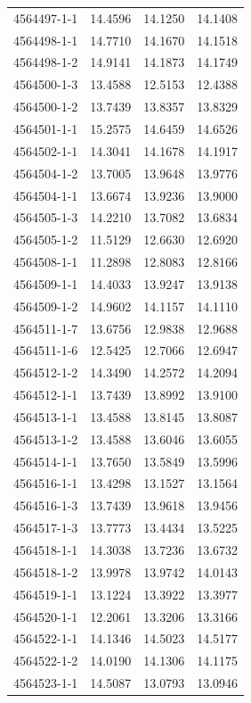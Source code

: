 \begin{longtable}{lrrr}
4564497-1-1 & 14.4596 & 14.1250 & 14.1408 \\
4564498-1-1 & 14.7710 & 14.1670 & 14.1518 \\
4564498-1-2 & 14.9141 & 14.1873 & 14.1749 \\
4564500-1-3 & 13.4588 & 12.5153 & 12.4388 \\
4564500-1-2 & 13.7439 & 13.8357 & 13.8329 \\
4564501-1-1 & 15.2575 & 14.6459 & 14.6526 \\
4564502-1-1 & 14.3041 & 14.1678 & 14.1917 \\
4564504-1-2 & 13.7005 & 13.9648 & 13.9776 \\
4564504-1-1 & 13.6674 & 13.9236 & 13.9000 \\
4564505-1-3 & 14.2210 & 13.7082 & 13.6834 \\
4564505-1-2 & 11.5129 & 12.6630 & 12.6920 \\
4564508-1-1 & 11.2898 & 12.8083 & 12.8166 \\
4564509-1-1 & 14.4033 & 13.9247 & 13.9138 \\
4564509-1-2 & 14.9602 & 14.1157 & 14.1110 \\
4564511-1-7 & 13.6756 & 12.9838 & 12.9688 \\
4564511-1-6 & 12.5425 & 12.7066 & 12.6947 \\
4564512-1-2 & 14.3490 & 14.2572 & 14.2094 \\
4564512-1-1 & 13.7439 & 13.8992 & 13.9100 \\
4564513-1-1 & 13.4588 & 13.8145 & 13.8087 \\
4564513-1-2 & 13.4588 & 13.6046 & 13.6055 \\
4564514-1-1 & 13.7650 & 13.5849 & 13.5996 \\
4564516-1-1 & 13.4298 & 13.1527 & 13.1564 \\
4564516-1-3 & 13.7439 & 13.9618 & 13.9456 \\
4564517-1-3 & 13.7773 & 13.4434 & 13.5225 \\
4564518-1-1 & 14.3038 & 13.7236 & 13.6732 \\
4564518-1-2 & 13.9978 & 13.9742 & 14.0143 \\
4564519-1-1 & 13.1224 & 13.3922 & 13.3977 \\
4564520-1-1 & 12.2061 & 13.3206 & 13.3166 \\
4564522-1-1 & 14.1346 & 14.5023 & 14.5177 \\
4564522-1-2 & 14.0190 & 14.1306 & 14.1175 \\
4564523-1-1 & 14.5087 & 13.0793 & 13.0946 \\

\end{longtable}
